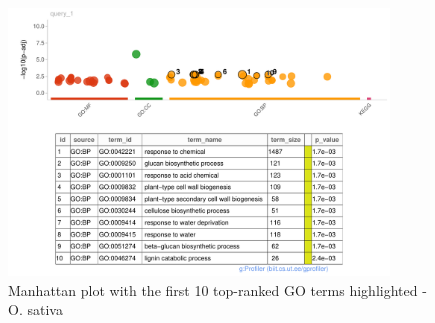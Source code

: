\begin{figure}[htbp]
    \caption{Manhattan plot with the first 10 top-ranked GO terms highlighted - O. sativa}
    \label{fig:5.2-Gost-Plot-Oryza_sativa}
    \includegraphics[width=0.9\textwidth]{../../results/plots-and-tables/5.2-Gost-Plot-Oryza_sativa}
\end{figure}